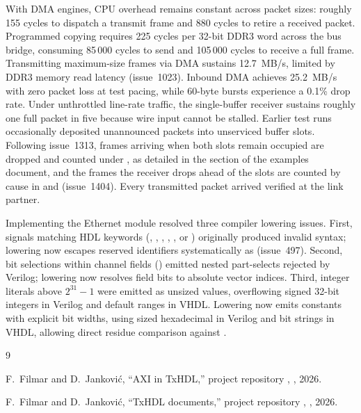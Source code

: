 \documentclass[journal,9pt]{IEEEtran}
\begin{document}
With DMA engines, CPU overhead remains constant across packet sizes: roughly
155 cycles to dispatch a transmit frame and 880 cycles to retire a received
packet. Programmed copying requires 225 cycles per 32-bit DDR3 word across the
bus bridge, consuming 85\,000 cycles to send and 105\,000 cycles to receive a
full frame. Transmitting maximum-size frames via DMA sustains 12.7~MB/s,
limited by DDR3 memory read latency (issue~1023). Inbound DMA achieves
25.2~MB/s with zero packet loss at test pacing, while 60-byte bursts experience
a 0.1\% drop rate. Under unthrottled line-rate traffic, the single-buffer
receiver sustains roughly one full packet in five because wire input cannot
be stalled. Earlier test runs occasionally deposited unannounced packets into
unserviced buffer slots. Following issue~1313, frames arriving when both
slots remain occupied are dropped and counted under , as
detailed in the  section of the examples document, and
the frames the receiver drops ahead of the slots are counted by cause in
 and  (issue~1404). Every
transmitted packet arrived verified at the link partner.

Implementing the Ethernet module resolved three compiler lowering issues.
First, signals matching HDL keywords (, , ,
, , or ) originally produced invalid syntax;
lowering now escapes reserved identifiers systematically as 
(issue~497). Second, bit selections within channel fields ()
emitted nested part-selects rejected by Verilog; lowering now resolves field
bits to absolute vector indices. Third, integer literals above $2^{31}-1$
were emitted as unsized values, overflowing signed 32-bit integers in Verilog
and default ranges in VHDL. Lowering now emits constants with explicit bit
widths, using sized hexadecimal in Verilog and bit strings in VHDL, allowing
direct residue comparison against .

\begin{thebibliography}{9}

F.~Filmar and D.~Janković, ``AXI in TxHDL,'' project repository
, , 2026.

F.~Filmar and D.~Janković, ``TxHDL documents,'' project repository
, , 2026.

\end{thebibliography}
\end{document}
